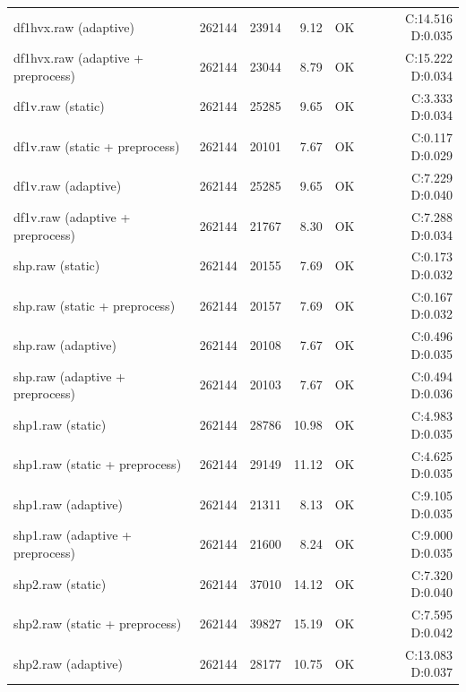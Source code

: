 \documentclass[a4paper,12pt]{article}
\begin{document}
{\begin{tabular}{lrrrrr}
            df1hvx.raw (adaptive)              & 262144       & 23914          & 9.12       & OK  & C:14.516 D:0.035 \\
            df1hvx.raw (adaptive + preprocess) & 262144       & 23044          & 8.79       & OK  & C:15.222 D:0.034 \\
            df1v.raw (static)                  & 262144       & 25285          & 9.65       & OK  & C:3.333 D:0.034  \\
            df1v.raw (static + preprocess)     & 262144       & 20101          & 7.67       & OK  & C:0.117 D:0.029  \\
            df1v.raw (adaptive)                & 262144       & 25285          & 9.65       & OK  & C:7.229 D:0.040  \\
            df1v.raw (adaptive + preprocess)   & 262144       & 21767          & 8.30       & OK  & C:7.288 D:0.034  \\
            shp.raw (static)                   & 262144       & 20155          & 7.69       & OK  & C:0.173 D:0.032  \\
            shp.raw (static + preprocess)      & 262144       & 20157          & 7.69       & OK  & C:0.167 D:0.032  \\
            shp.raw (adaptive)                 & 262144       & 20108          & 7.67       & OK  & C:0.496 D:0.035  \\
            shp.raw (adaptive + preprocess)    & 262144       & 20103          & 7.67       & OK  & C:0.494 D:0.036  \\
            shp1.raw (static)                  & 262144       & 28786          & 10.98      & OK  & C:4.983 D:0.035  \\
            shp1.raw (static + preprocess)     & 262144       & 29149          & 11.12      & OK  & C:4.625 D:0.035  \\
            shp1.raw (adaptive)                & 262144       & 21311          & 8.13       & OK  & C:9.105 D:0.035  \\
            shp1.raw (adaptive + preprocess)   & 262144       & 21600          & 8.24       & OK  & C:9.000 D:0.035  \\
            shp2.raw (static)                  & 262144       & 37010          & 14.12      & OK  & C:7.320 D:0.040  \\
            shp2.raw (static + preprocess)     & 262144       & 39827          & 15.19      & OK  & C:7.595 D:0.042  \\
            shp2.raw (adaptive)                & 262144       & 28177          & 10.75      & OK  & C:13.083 D:0.037 \\

\end{tabular}}
\end{document}
